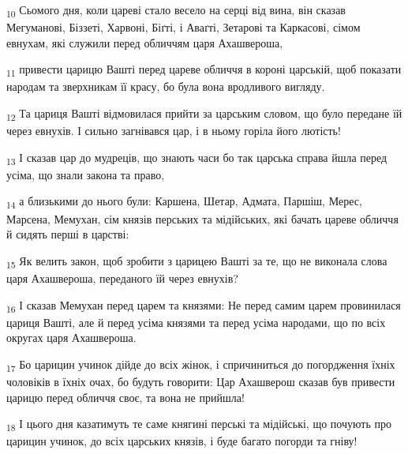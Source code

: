 \begin{tcolorbox}
\textsubscript{10} Сьомого дня, коли цареві стало весело на серці від вина, він сказав Мегуманові, Біззеті, Харвоні, Біґті, і Аваґті, Зетарові та Каркасові, сімом евнухам, які служили перед обличчям царя Ахашвероша,
\end{tcolorbox}
\begin{tcolorbox}
\textsubscript{11} привести царицю Вашті перед цареве обличчя в короні царській, щоб показати народам та зверхникам її красу, бо була вона вродливого вигляду.
\end{tcolorbox}
\begin{tcolorbox}
\textsubscript{12} Та цариця Вашті відмовилася прийти за царським словом, що було передане їй через евнухів. І сильно загнівався цар, і в ньому горіла його лютість!
\end{tcolorbox}
\begin{tcolorbox}
\textsubscript{13} І сказав цар до мудреців, що знають часи бо так царська справа йшла перед усіма, що знали закона та право,
\end{tcolorbox}
\begin{tcolorbox}
\textsubscript{14} а близькими до нього були: Каршена, Шетар, Адмата, Паршіш, Мерес, Марсена, Мемухан, сім князів перських та мідійських, які бачать цареве обличчя й сидять перші в царстві:
\end{tcolorbox}
\begin{tcolorbox}
\textsubscript{15} Як велить закон, щоб зробити з царицею Вашті за те, що не виконала слова царя Ахашвероша, переданого їй через евнухів?
\end{tcolorbox}
\begin{tcolorbox}
\textsubscript{16} І сказав Мемухан перед царем та князями: Не перед самим царем провинилася цариця Вашті, але й перед усіма князями та перед усіма народами, що по всіх округах царя Ахашвероша.
\end{tcolorbox}
\begin{tcolorbox}
\textsubscript{17} Бо царицин учинок дійде до всіх жінок, і спричиниться до погордження їхніх чоловіків в їхніх очах, бо будуть говорити: Цар Ахашверош сказав був привести царицю перед обличчя своє, та вона не прийшла!
\end{tcolorbox}
\begin{tcolorbox}
\textsubscript{18} І цього дня казатимуть те саме княгині перські та мідійські, що почують про царицин учинок, до всіх царських князів, і буде багато погорди та гніву!
\end{tcolorbox}
